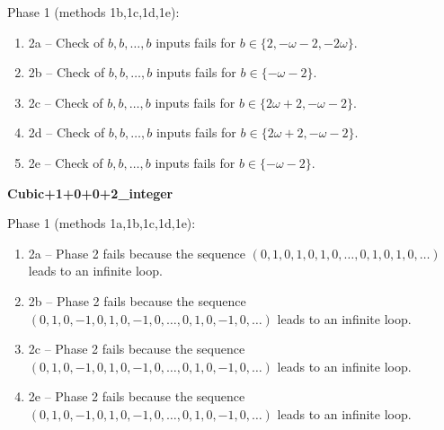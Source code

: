 \begin{exmp}
Phase 1 (methods 1b,\allowbreak  1c,\allowbreak  1d,\allowbreak  1e):
\begin{enumerate}[ ]
\item  2a -- Check of $b,\allowbreak b,\allowbreak \dots,\allowbreak b$ inputs fails for $b\in \{2,\allowbreak  -\omega - 2,\allowbreak  -2\omega\}$.
\item  2b -- Check of $b,\allowbreak b,\allowbreak \dots,\allowbreak b$ inputs fails for $b\in \{-\omega - 2\}$.
\item  2c -- Check of $b,\allowbreak b,\allowbreak \dots,\allowbreak b$ inputs fails for $b\in \{2\omega + 2,\allowbreak  -\omega - 2\}$.
\item  2d -- Check of $b,\allowbreak b,\allowbreak \dots,\allowbreak b$ inputs fails for $b\in \{2\omega + 2,\allowbreak  -\omega - 2\}$.
\item  2e -- Check of $b,\allowbreak b,\allowbreak \dots,\allowbreak b$ inputs fails for $b\in \{-\omega - 2\}$.
\end{enumerate}


\end{exmp}




\begin{exmp}
\label{ex:compareAR}

\textbf{Cubic+1+0+0+2\_integer}

Phase 1 (methods 1a,\allowbreak  1b,\allowbreak  1c,\allowbreak  1d,\allowbreak  1e):
\begin{enumerate}[ ]
\item  2a -- Phase 2   fails because  the sequence $(0,\allowbreak  1,\allowbreak  0,\allowbreak  1,\allowbreak  0,\allowbreak  1,\allowbreak  0,\allowbreak  \dots ,\allowbreak 0,\allowbreak  1,\allowbreak  0,\allowbreak  1,\allowbreak  0,\allowbreak  \dots)$ leads to an infinite loop.
\item  2b -- Phase 2   fails because  the sequence $(0,\allowbreak  1,\allowbreak  0,\allowbreak  -1,\allowbreak  0,\allowbreak  1,\allowbreak  0,\allowbreak  -1,\allowbreak  0,\allowbreak  \dots ,\allowbreak 0,\allowbreak  1,\allowbreak  0,\allowbreak  -1,\allowbreak  0,\allowbreak  \dots)$ leads to an infinite loop.
\item  2c -- Phase 2   fails because  the sequence $(0,\allowbreak  1,\allowbreak  0,\allowbreak  -1,\allowbreak  0,\allowbreak  1,\allowbreak  0,\allowbreak  -1,\allowbreak  0,\allowbreak  \dots ,\allowbreak 0,\allowbreak  1,\allowbreak  0,\allowbreak  -1,\allowbreak  0,\allowbreak  \dots)$ leads to an infinite loop.
\item  2e -- Phase 2   fails because  the sequence $(0,\allowbreak  1,\allowbreak  0,\allowbreak  -1,\allowbreak  0,\allowbreak  1,\allowbreak  0,\allowbreak  -1,\allowbreak  0,\allowbreak  \dots ,\allowbreak 0,\allowbreak  1,\allowbreak  0,\allowbreak  -1,\allowbreak  0,\allowbreak  \dots)$ leads to an infinite loop.
\end{enumerate}


\end{exmp}




